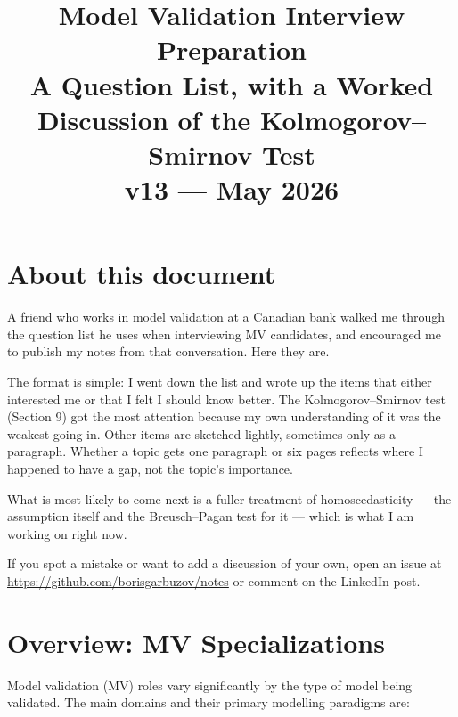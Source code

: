 \documentclass[11pt, a4paper]{article}
\title{\textbf{Model Validation Interview Preparation}\\[0.4em]
\large A Question List, with a Worked Discussion of the Kolmogorov--Smirnov Test\\[0.2em]
\normalsize v13 --- May 2026}
\author{}
\date{}
\begin{document}
\maketitle
{\small\tableofcontents}

\clearpage

\section{About this document}

A friend who works in model validation at a Canadian bank walked me
through the question list he uses when interviewing MV candidates,
and encouraged me to publish my notes from that conversation.  Here
they are.

The format is simple: I went down the list and wrote up the items
that either interested me or that I felt I should know better.  The
Kolmogorov--Smirnov test (Section 9) got the most attention because
my own understanding of it was the weakest going in.  Other items
are sketched lightly, sometimes only as a paragraph.  Whether a
topic gets one paragraph or six pages reflects where I happened to
have a gap, not the topic's importance.

What is most likely to come next is a fuller treatment of
homoscedasticity --- the assumption itself and the Breusch--Pagan
test for it --- which is what I am working on right now.

If you spot a mistake or want to add a discussion of your own,
open an issue at
\url{https://github.com/borisgarbuzov/notes} or comment on the
LinkedIn post.

\section{Overview: MV Specializations}

Model validation (MV) roles vary significantly by the type of model being validated.
The main domains and their primary modelling paradigms are:
\end{document}
